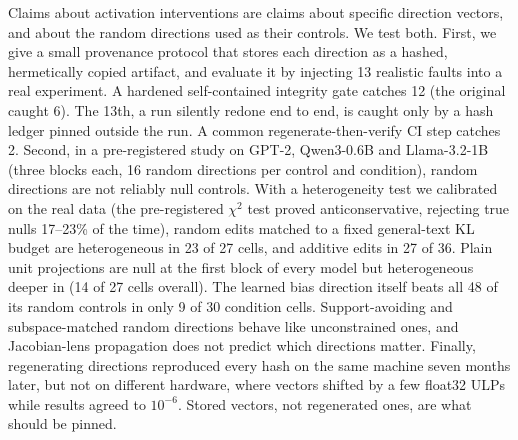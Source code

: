 Claims about activation interventions are claims about specific
direction vectors, and about the random directions used as their
controls. We test both. First, we give a small provenance protocol that
stores each direction as a hashed, hermetically copied artifact, and
evaluate it by injecting 13 realistic faults into a real experiment. A
hardened self-contained integrity gate catches 12 (the original caught
6). The 13th, a run silently redone end to end, is caught only by a hash
ledger pinned outside the run. A common regenerate-then-verify CI step
catches 2. Second, in a pre-registered study on GPT-2, Qwen3-0.6B and
Llama-3.2-1B (three blocks each, 16 random directions per control and
condition), random directions are not reliably null controls. With a
heterogeneity test we calibrated on the real data (the pre-registered $\chi^2$
test proved anticonservative, rejecting true nulls 17--23\% of the
time), random edits matched to a fixed general-text KL budget are
heterogeneous in 23 of 27 cells, and additive edits in 27 of 36. Plain
unit projections are null at the first block of every model but
heterogeneous deeper in (14 of 27 cells overall). The learned bias
direction itself beats all 48 of its random controls in only 9 of 30
condition cells. Support-avoiding and subspace-matched random directions
behave like unconstrained ones, and Jacobian-lens propagation does not
predict which directions matter. Finally, regenerating directions
reproduced every hash on the same machine seven months later, but not on
different hardware, where vectors shifted by a few float32 ULPs while
results agreed to $10^{-6}$. Stored vectors, not regenerated ones, are what
should be pinned.
